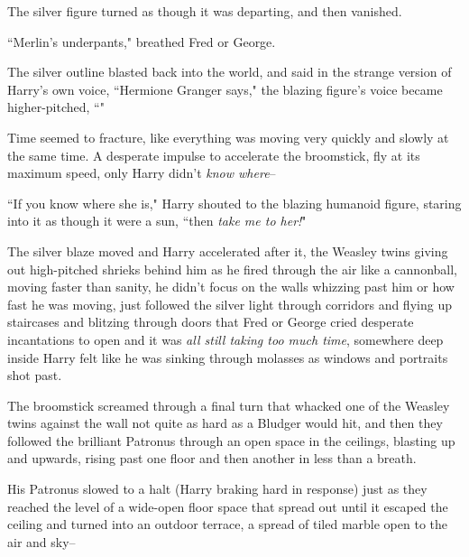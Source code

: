 The silver figure turned as though it was departing, and then vanished.

``Merlin's underpants," breathed Fred or George.

The silver outline blasted back into the world, and said in the strange version of Harry's own voice, ``Hermione Granger says," the blazing figure's voice became higher-pitched, ``"

Time seemed to fracture, like everything was moving very quickly and slowly at the same time. A desperate impulse to accelerate the broomstick, fly at its maximum speed, only Harry didn't \emph{know where}\---

``If you know where she is," Harry shouted to the blazing humanoid figure, staring into it as though it were a sun, ``then \emph{take me to her!}"

The silver blaze moved and Harry accelerated after it, the Weasley twins giving out high-pitched shrieks behind him as he fired through the air like a cannonball, moving faster than sanity, he didn't focus on the walls whizzing past him or how fast he was moving, just followed the silver light through corridors and flying up staircases and blitzing through doors that Fred or George cried desperate incantations to open and it was \emph{all still taking too much time}, somewhere deep inside Harry felt like he was sinking through molasses as windows and portraits shot past.

The broomstick screamed through a final turn that whacked one of the Weasley twins against the wall not quite as hard as a Bludger would hit, and then they followed the brilliant Patronus through an open space in the ceilings, blasting up and upwards, rising past one floor and then another in less than a breath.

His Patronus slowed to a halt (Harry braking hard in response) just as they reached the level of a wide-open floor space that spread out until it escaped the ceiling and turned into an outdoor terrace, a spread of tiled marble open to the air and sky\---


